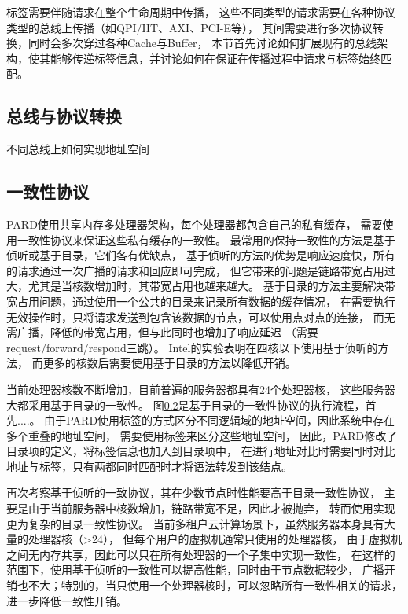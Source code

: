 标签需要伴随请求在整个生命周期中传播，
这些不同类型的请求需要在各种协议类型的总线上传播（如QPI/HT、AXI、PCI-E等），
其间需要进行多次协议转换，同时会多次穿过各种Cache与Buffer，
本节首先讨论如何扩展现有的总线架构，使其能够传递标签信息，并讨论如何在保证在传播过程中请求与标签始终匹配。

\subsection{总线与协议转换}

不同总线上如何实现地址空间


\subsection{一致性协议}

PARD使用共享内存多处理器架构，每个处理器都包含自己的私有缓存，
需要使用一致性协议来保证这些私有缓存的一致性。
最常用的保持一致性的方法是基于侦听或基于目录，它们各有优缺点，
基于侦听的方法的优势是响应速度快，所有的请求通过一次广播的请求和回应即可完成，
但它带来的问题是链路带宽占用过大，尤其是当核数增加时，其带宽占用也越来越大。
基于目录的方法主要解决带宽占用问题，通过使用一个公共的目录来记录所有数据的缓存情况，
在需要执行无效操作时，只将请求发送到包含该数据的节点，可以使用点对点的连接，
而无需广播，降低的带宽占用，但与此同时也增加了响应延迟
（需要request/forward/respond三跳）。
Intel的实验\cite{}表明在四核以下使用基于侦听的方法，
而更多的核数后需要使用基于目录的方法以降低开销。

当前处理器核数不断增加，目前普遍的服务器都具有24个处理器核，
这些服务器大都采用基于目录的一致性。
图\ref{}是基于目录的一致性协议的执行流程，首先....。
由于PARD使用标签的方式区分不同逻辑域的地址空间，因此系统中存在多个重叠的地址空间，
需要使用标签来区分这些地址空间，
因此，PARD修改了目录项的定义，将标签信息也加入到目录项中，
在进行地址对比时需要同时对比地址与标签，只有两都同时匹配时才将语法转发到该结点。

再次考察基于侦听的一致协议，其在少数节点时性能要高于目录一致性协议，
主要是由于当前服务器中核数增加，链路带宽不足，因此才被抛弃，
转而使用实现更为复杂的目录一致性协议。
当前多租户云计算场景下，虽然服务器本身具有大量的处理器核（>24），
但每个用户的虚拟机通常只使用的处理器核\cite{}，    %
由于虚拟机之间无内存共享，因此可以只在所有处理器的一个子集中实现一致性，
在这样的范围下，使用基于侦听的一致性可以提高性能，同时由于节点数据较少，
广播开销也不大；特别的，当只使用一个处理器核时，可以忽略所有一致性相关的请求，
进一步降低一致性开销。

